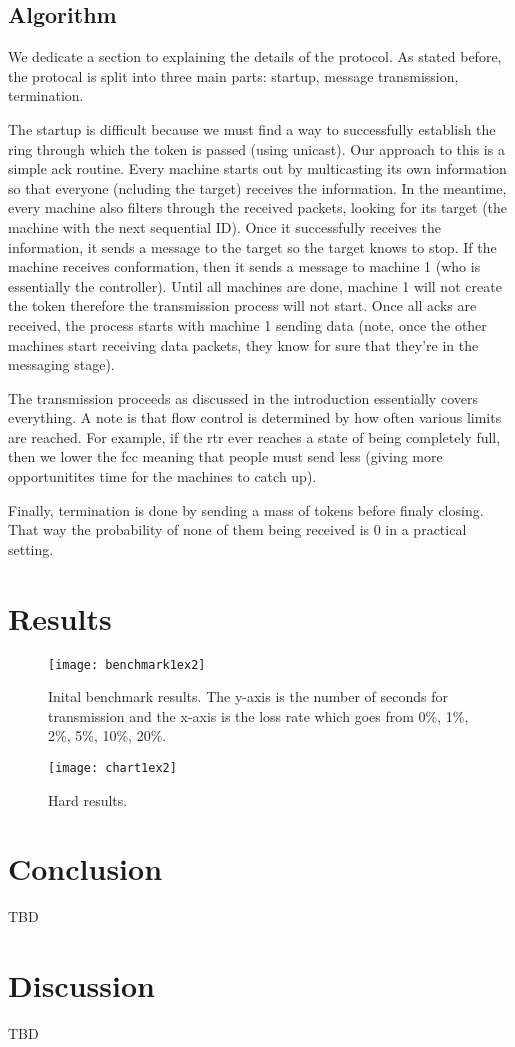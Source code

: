 \documentclass[12pt,journal,compsoc]{IEEEtran}
\begin{document}
\subsection{Algorithm}
We dedicate a section to explaining the details of the protocol. As stated before, the protocal is split into three main parts: startup, message transmission, termination.

The startup is difficult because we must find a way to successfully establish the ring through which the token is passed (using unicast). Our approach to this is a simple ack routine. Every machine starts out by multicasting its own information so that everyone (ncluding the target) receives the information. In the meantime, every machine also filters through the received packets, looking for its target (the machine with the next sequential ID). Once it successfully receives the information, it sends a message to the target so the target knows to stop. If the machine receives conformation, then it sends a message to machine 1 (who is essentially the controller). Until all machines are done, machine 1 will not create the token therefore the transmission process will not start. Once all acks are received, the process starts with machine 1 sending data (note, once the other machines start receiving data packets, they know for sure that they're in the messaging stage).

The transmission proceeds as discussed in the introduction essentially covers everything. A note is that flow control is determined by how often various limits are reached. For example, if the rtr ever reaches a state of being completely full, then we lower the fcc meaning that people must send less (giving more opportunitites time for the machines to catch up).

Finally, termination is done by sending a mass of tokens before finaly closing. That way the probability of none of them being received is 0 in a practical setting.

\section{Results}
\begin{figure}[h]
\centering
\texttt{[image: benchmark1ex2]}
\caption{Inital benchmark results. The y-axis is the number of seconds for transmission and the x-axis is the loss rate which goes from 0\%, 1\%, 2\%, 5\%, 10\%, 20\%.}
\end{figure}

\begin{figure}[h]
\centering
\texttt{[image: chart1ex2]}
\caption{Hard results.}
\end{figure}

\section{Conclusion}
TBD
\section{Discussion}
TBD
\end{document}
